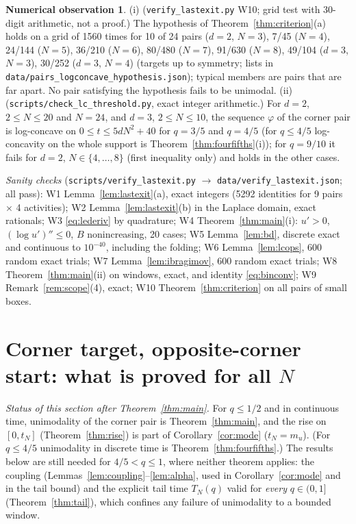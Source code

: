 \documentclass[11pt,a4paper]{article}
\theoremstyle{definition}
\newtheorem{observation}[theorem]{Numerical observation}
\begin{document}
\begin{observation}\label{obs:hyp}
(i) (\texttt{verify\_lastexit.py} W10; grid test with 30-digit arithmetic, not a proof.) The hypothesis of Theorem~\ref{thm:criterion}(a) holds on a grid of 1560 times for 10 of 24 pairs ($d=2$, $N=3$), 7/45 ($N=4$), 24/144 ($N=5$), 36/210 ($N=6$), 80/480 ($N=7$), 91/630 ($N=8$), 49/104 ($d=3$, $N=3$), 30/252 ($d=3$, $N=4$) (targets up to symmetry; lists in \texttt{data/pairs\_logconcave\_hypothesis.json}); typical members are pairs that are far apart. No pair satisfying the hypothesis fails to be unimodal.
(ii) (\texttt{scripts/check\_lc\_threshold.py}, exact integer arithmetic.) For $d=2$, $2\le N\le20$ and $N=24$, and $d=3$, $2\le N\le10$, the sequence $\varphi$ of the corner pair is log-concave on $0\le t\le5dN^2+40$ for $q=3/5$ and $q=4/5$ (for $q\le4/5$ log-concavity on the whole support is Theorem~\ref{thm:fourfifths}(i)); for $q=9/10$ it fails for $d=2$, $N\in\{4,\dots,8\}$ (first inequality only) and holds in the other cases.
\end{observation}

\emph{Sanity checks} (\texttt{scripts/verify\_lastexit.py} $\to$ \texttt{data/verify\_lastexit.json}; all pass): W1 Lemma~\ref{lem:lastexit}(a), exact integers (5292 identities for 9 pairs $\times$ 4 activities); W2 Lemma~\ref{lem:lastexit}(b) in the Laplace domain, exact rationals; W3 \eqref{eq:lederiv} by quadrature; W4 Theorem~\ref{thm:main}(i): $u'>0$, $(\log u')''\le0$, $B$ nonincreasing, 20 cases; W5 Lemma~\ref{lem:bd}, discrete exact and continuous to $10^{-40}$, including the folding; W6 Lemma~\ref{lem:lcops}, 600 random exact trials; W7 Lemma~\ref{lem:ibragimov}, 600 random exact trials; W8 Theorem~\ref{thm:main}(ii) on windows, exact, and identity \eqref{eq:binconv}; W9 Remark~\ref{rem:scope}(4), exact; W10 Theorem~\ref{thm:criterion} on all pairs of small boxes.

\section{Corner target, opposite-corner start: what is proved for all $N$}\label{sec:corner}

\emph{Status of this section after Theorem~\ref{thm:main}.} For $q\le1/2$ and in continuous time, unimodality of the corner pair is Theorem~\ref{thm:main}, and the rise on $[0,t_N]$ (Theorem~\ref{thm:rise}) is part of Corollary~\ref{cor:mode} ($t_N=m_u$). (For $q\le4/5$ unimodality in discrete time is Theorem~\ref{thm:fourfifths}.) The results below are still needed for $4/5<q\le1$, where neither theorem applies: the coupling (Lemmas~\ref{lem:coupling}--\ref{lem:alpha}, used in Corollary~\ref{cor:mode} and in the tail bound) and the explicit tail time $T_N(q)$ valid for \emph{every} $q\in(0,1]$ (Theorem~\ref{thm:tail}), which confines any failure of unimodality to a bounded window.
\end{document}
